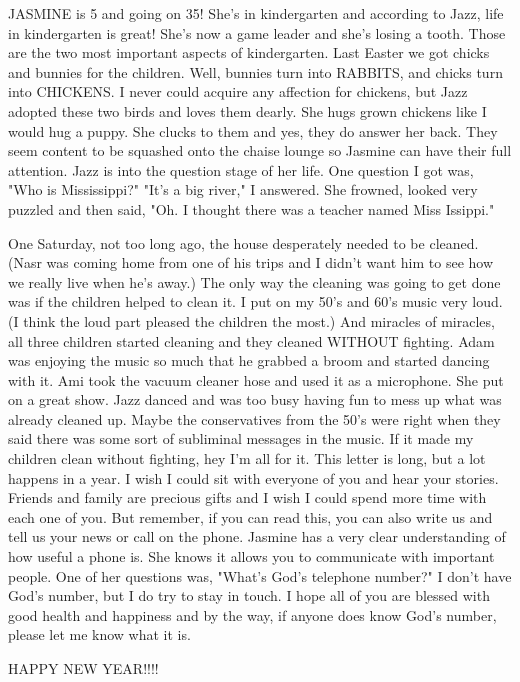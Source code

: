 JASMINE is 5 and going on 35! She's in kindergarten and according to Jazz, life in kindergarten is great! She's now a game leader and she's
losing a tooth. Those are the two most important aspects of kindergarten. Last Easter we got chicks and bunnies for the children. Well, bunnies
turn into RABBITS, and chicks turn into CHICKENS. I never could acquire any affection for chickens, but Jazz adopted these two birds and loves
them dearly. She hugs grown chickens like I would hug a puppy. She clucks to them and yes, they do answer her back. They seem content to be
squashed onto the chaise lounge so Jasmine can have their full attention. Jazz is into the question stage of her life. One question I got was,
"Who is Mississippi?" "It's a big river," I answered. She frowned, looked very puzzled and then said, "Oh. I thought there was a teacher named
Miss Issippi."

One Saturday, not too long ago, the house desperately needed to be cleaned. (Nasr was coming home from one of his trips and I didn't want him to
see how we really live when he's away.) The only way the cleaning was going to get done was if the children helped to clean it. I put on my 50's
and 60's music very loud. (I think the loud part pleased the children the most.) And miracles of miracles, all three children started cleaning
and they cleaned WITHOUT fighting. Adam was enjoying the music so much that he grabbed a broom and started dancing with it. Ami took the vacuum
cleaner hose and used it as a microphone. She put on a great show. Jazz danced and was too busy having fun to mess up what was already cleaned
up. Maybe the conservatives from the 50's were right when they said there was some sort of subliminal messages in the music. If it made my
children clean without fighting, hey I'm all for it. This letter is long, but a lot happens in a year. I wish I could sit with everyone of you
and hear your stories. Friends and family are precious gifts and I wish I could spend more time with each one of you. But remember, if you can
read this, you can also write us and tell us your news or call on the phone. Jasmine has a very clear understanding of how useful a phone is.
She knows it allows you to communicate with important people. One of her questions was, "What's God's telephone number?" I don't have God's
number, but I do try to stay in touch. I hope all of you are blessed with good health and happiness and by the way, if anyone does know God's
number, please let me know what it is.

HAPPY NEW YEAR!!!!





%
